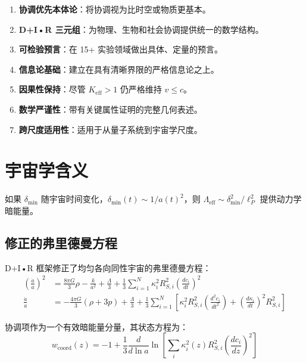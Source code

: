 \documentclass[11pt,a4paper]{article}
\begin{document}
	\begin{enumerate}
		\item \textbf{协调优先本体论}：将协调视为比时空或物质更基本。
		
		\item \textbf{D+I•R 三元组}：为物理、生物和社会协调提供统一的数学结构。
		
		\item \textbf{可检验预言}：在 15+ 实验领域做出具体、定量的预言。
		
		\item \textbf{信息论基础}：建立在具有清晰界限的严格信息论之上。
		
		\item \textbf{因果性保持}：尽管 $K_{\mathrm{eff}} > 1$ 仍严格维持 $v \leq c$。
		
		\item \textbf{数学严谨性}：带有关键属性证明的完整几何表述。
		
		\item \textbf{跨尺度适用性}：适用于从量子系统到宇宙学尺度。
	\end{enumerate}
	
	\section{宇宙学含义}
	如果 $\delta_{\min}$ 随宇宙时间变化，$\delta_{\min}(t) \sim 1/a(t)^2$，则 $\Lambda_{\text{eff}} \sim \delta_{\min}^2/\ell_P^2$ 提供动力学暗能量。
	
	\subsection{修正的弗里德曼方程}
	
	D+I•R 框架修正了均匀各向同性宇宙的弗里德曼方程：
	\begin{align}
		\left(\frac{\dot{a}}{a}\right)^2 &= \frac{8\pi G}{3}\rho - \frac{k}{a^2} + \frac{\Lambda}{3} + \frac{1}{3}\sum_{i=1}^N \kappa_i^2 R_{S,i}^2 \left(\frac{dc_i}{dt}\right)^2 \\
		\frac{\ddot{a}}{a} &= -\frac{4\pi G}{3}(\rho + 3p) + \frac{\Lambda}{3} + \frac{1}{3}\sum_{i=1}^N \left[ \kappa_i^2 R_{S,i}^2 \left(\frac{d^2c_i}{dt^2}\right) + \left(\frac{d\kappa_i}{dt}\right)^2 R_{S,i}^2 \right]
	\end{align}
	
	协调项作为一个有效暗能量分量，其状态方程为：
	\begin{equation}
		w_{\text{coord}}(z) = -1 + \frac{1}{3} \frac{d}{d\ln a} \ln \left[ \sum_i \kappa_i^2(z) R_{S,i}^2 \left(\frac{dc_i}{dz}\right)^2 \right]
	\end{equation}
	
\end{document}
